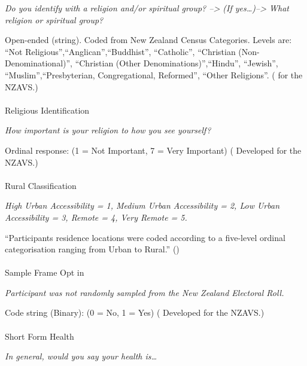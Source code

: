 \documentclass[
  single column]{article}
\makeatletter
\let\oldparagraph\paragraph
\renewcommand{\paragraph}{
    \@ifstar
      \xxxParagraphStar
      \xxxParagraphNoStar
  }
\newcommand{\xxxParagraphStar}[1]{\oldparagraph*{#1}\mbox{}}
\newcommand{\xxxParagraphNoStar}[1]{\oldparagraph{#1}\mbox{}}
\makeatother
\begin{document}
\emph{Do you identify with a religion and/or spiritual group?
--\textgreater{} (If yes\ldots)--\textgreater{} What religion or
spiritual group?}

Open-ended (string). Coded from New Zealand Census Categories. Levels
are: ``Not Religious'',``Anglican'',``Buddhist'', ``Catholic'',
``Christian (Non-Denominational)'', ``Christian (Other
Denominations)'',``Hindu'', ``Jewish'', ``Muslim'',``Presbyterian,
Congregational, Reformed'', ``Other Religions''.
( for the NZAVS.)

\paragraph{Religious Identification}\label{religious-identification}

\emph{How important is your religion to how you see yourself?}

Ordinal response: (1 = Not Important, 7 = Very Important)
( Developed for the
NZAVS.)

\paragraph{Rural Classification}\label{rural-classification}

\emph{High Urban Accessibility = 1, Medium Urban Accessibility = 2, Low
Urban Accessibility = 3, Remote = 4, Very Remote = 5.}

``Participants residence locations were coded according to a five-level
ordinal categorisation ranging from Urban to Rural.''
()

\paragraph{Sample Frame Opt in}\label{sample-frame-opt-in}

\emph{Participant was not randomly sampled from the New Zealand
Electoral Roll.}

Code string (Binary): (0 = No, 1 = Yes)
( Developed for the
NZAVS.)

\paragraph{Short Form Health}\label{short-form-health}

\emph{In general, would you say your health is\ldots{}}
\end{document}
